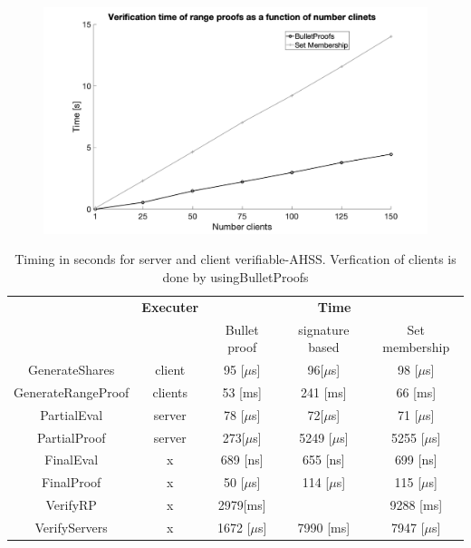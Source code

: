 \begin{figure}[]
\includegraphics[width=\linewidth]{./figure/verification_nrClients.png}
\end{figure}


\begin{table}
\label{tab:BenchBP}
\caption{Timing in seconds for server and client verifiable-AHSS. Verfication of clients is done by usingBulletProofs}
\centering
\begin{tabular}{*{5}{c}}
\hline
    										&  \textbf{Executer}   & \multicolumn{3}{c}{\textbf{Time}}   		\\ 
    										& 								& Bullet proof  & signature based & Set membership \\	\hline
  GenerateShares 				&  client  					&   95 [$\mu$s]			 &96[$\mu$s]  &98 [$\mu$s]												\\ \hline 
  GenerateRangeProof  		&  clients  					&   53 [ms]				& 	241 [ms]	&66 [ms]			\\ \hline 
  PartialEval  						&  server  					&   78	[$\mu$s]				&72[$\mu$s]	 		&	71	 [$\mu$s]							\\ \hline 
  PartialProof 					&  server 					&   273[$\mu$s]						& 5249 [$\mu$s]			& 5255 [$\mu$s]				\\ \hline 
  FinalEval  						&  x  							&   689 [ns]						&655  [ns]				&			699  [ns]												\\ \hline 
  FinalProof  						&  x 							&   50	[$\mu$s]			&  114 [$\mu$s]	&				115 [$\mu$s]									\\ \hline 
  VerifyRP							&  x 							&   2979[ms]					&  &					9288 [ms]							\\ \hline 
  VerifyServers					&  x 							&   1672 [$\mu$s]					&		7990 [ms] 	&		7947 [$\mu$s]					\\ \hline 
\end{tabular}
 \end{table}